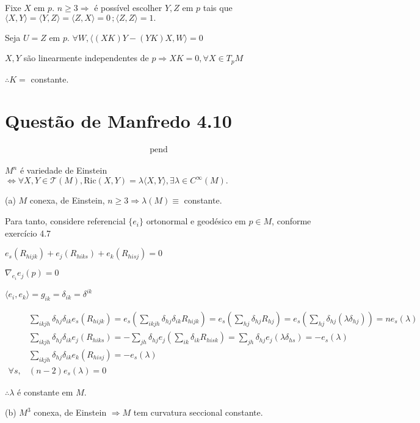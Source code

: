 \documentclass[10pt,a4paper]{article}
\begin{document}
		Fixe $X$ em $p$. $n \ge 3 \Rightarrow$ \'e poss\'ivel escolher $Y, Z$ em $p$ tais que $\langle X, Y \rangle = \langle Y, Z \rangle = \langle Z, X \rangle = 0\,; \langle Z, Z \rangle = 1.$

		Seja $U = Z$ em $p$. $\forall W, \langle (XK)Y - (YK)X, W \rangle = 0$

		$X, Y$ s\~ao linearmente independentes de $p \Rightarrow XK = 0, \forall X \in T_pM$

		$\therefore K = $ constante.

	\section{Quest\~ao de Manfredo 4.10}
		\begin{flushright}
		\end{flushright}

		\begin{align}
		\text{pend}
		\end{align}

		$M^n$ \'e variedade de Einstein $\Leftrightarrow \forall X, Y \in \mathcal{T}(M), \text{Ric}(X,Y) = \lambda \langle X, Y \rangle, \exists \lambda \in C^\infty(M).$

		(a) $M$ conexa, de Einstein, $n \ge 3 \Rightarrow \lambda(M) \equiv $ constante.

		Para tanto, considere referencial $\{ e_i \}$ ortonormal e geod\'esico em $p \in M$, conforme exerc\'icio 4.7

		$e_s (R_{hijk}) + e_j (R_{hiks}) + e_k (R_{hisj}) = 0$

		$\nabla_{e_i} e_j (p) = 0$

		$\langle e_i, e_k \rangle = g_{ik} = \delta_{ik} = \delta^{ik}$

		\begin{align*}
		&\sum_{ikjh} \delta_{hj} \delta_{ik} e_s (R_{hijk}) = e_s (\sum_{ikjh} \delta_{hj} \delta_{ik} R_{hijk}) = e_s (\sum_{hj} \delta_{hj} R_{hj}) = e_s (\sum_{hj} \delta_{hj} (\lambda \delta_{hj})) = ne_s(\lambda) \\
		&\sum_{ikjh} \delta_{hj} \delta_{ik} e_j (R_{hiks}) = - \sum_{jh} \delta_{hj} e_j (\sum_{ik} \delta_{ik} R_{hisk}) = \sum_{jh} \delta_{hj} e_j (\lambda \delta_{hs}) = -e_s(\lambda) \\
		&\sum_{ikjh} \delta_{hj} \delta_{ik} e_k (R_{hisj}) = - e_s(\lambda) \\
		\forall s, &(n - 2)e_s(\lambda) = 0
		\end{align*}

		$\therefore \lambda$ \'e constante em $M$.

		\vspace{3mm}

		(b) $M^3$ conexa, de Einstein $\Rightarrow M$ tem curvatura seccional constante.

		\vspace{3mm}
\end{document}
